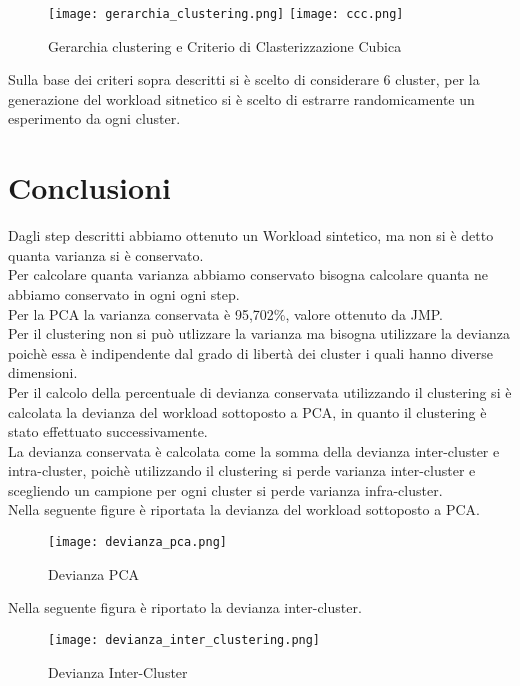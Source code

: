 \begin{figure}[htbp]
\centering
\texttt{[image: gerarchia\_clustering.png]}%
\qquad\qquad
\texttt{[image: ccc.png]}
\caption{Gerarchia clustering e Criterio di Clasterizzazione Cubica}
\label{ccc}
\end{figure}

Sulla base dei criteri sopra descritti si è scelto di considerare 6 cluster, per
la generazione del workload sitnetico si è scelto di estrarre randomicamente
un esperimento da ogni cluster.\\
\clearpage
\section{Conclusioni}
Dagli step descritti abbiamo ottenuto un Workload sintetico,
ma non si è detto quanta varianza si è conservato.\\
Per calcolare quanta varianza abbiamo conservato bisogna calcolare quanta
ne abbiamo conservato in ogni ogni step.\\
Per la PCA la varianza conservata è 95,702\%, valore ottenuto da JMP.\\
Per il clustering non si può  utlizzare la varianza ma bisogna utilizzare la devianza
poichè essa è indipendente dal grado di libertà dei cluster i quali hanno diverse
dimensioni.\\
Per il calcolo della percentuale di devianza conservata utilizzando il clustering
si è calcolata la devianza del workload sottoposto a PCA, in quanto il clustering è stato
effettuato successivamente.\\
La devianza conservata è calcolata come la somma della  devianza inter-cluster
e intra-cluster, poichè utilizzando il clustering si perde varianza inter-cluster
e scegliendo un campione per ogni cluster si perde varianza infra-cluster.\\
Nella seguente figure è riportata la devianza del workload sottoposto a PCA.\\

\begin{figure}[!htbp]
	\texttt{[image: devianza\_pca.png]}
  \caption{Devianza PCA}
  \label{}
\end{figure}
\clearpage

Nella seguente figura è riportato la devianza inter-cluster.\\

\begin{figure}[!htbp]
	\texttt{[image: devianza\_inter\_clustering.png]}
  \caption{Devianza Inter-Cluster}
  \label{}
\end{figure}

